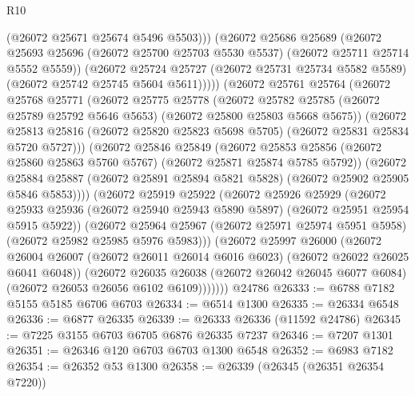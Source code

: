 \begin{lexlean}{R10}
\begin{coremodule}
                (@26072 @25671 @25674 @5496 @5503)))
            (@26072
              @25686
              @25689
              (@26072
                @25693
                @25696
                (@26072 @25700 @25703 @5530 @5537)
                (@26072 @25711 @25714 @5552 @5559))
              (@26072
                @25724
                @25727
                (@26072 @25731 @25734 @5582 @5589)
                (@26072 @25742 @25745 @5604 @5611)))))
        (@26072
          @25761
          @25764
          (@26072
            @25768
            @25771
            (@26072
              @25775
              @25778
              (@26072
                @25782
                @25785
                (@26072 @25789 @25792 @5646 @5653)
                (@26072 @25800 @25803 @5668 @5675))
              (@26072
                @25813
                @25816
                (@26072 @25820 @25823 @5698 @5705)
                (@26072 @25831 @25834 @5720 @5727)))
            (@26072
              @25846
              @25849
              (@26072
                @25853
                @25856
                (@26072 @25860 @25863 @5760 @5767)
                (@26072 @25871 @25874 @5785 @5792))
              (@26072
                @25884
                @25887
                (@26072 @25891 @25894 @5821 @5828)
                (@26072 @25902 @25905 @5846 @5853))))
          (@26072
            @25919
            @25922
            (@26072
              @25926
              @25929
              (@26072
                @25933
                @25936
                (@26072 @25940 @25943 @5890 @5897)
                (@26072 @25951 @25954 @5915 @5922))
              (@26072
                @25964
                @25967
                (@26072 @25971 @25974 @5951 @5958)
                (@26072 @25982 @25985 @5976 @5983)))
            (@26072
              @25997
              @26000
              (@26072
                @26004
                @26007
                (@26072 @26011 @26014 @6016 @6023)
                (@26072 @26022 @26025 @6041 @6048))
              (@26072
                @26035
                @26038
                (@26072 @26042 @26045 @6077 @6084)
                (@26072 @26053 @26056 @6102 @6109)))))))
    @24786
@26333 := @6788 @7182 @5155 @5185 @6706 @6703
@26334 := @6514 @1300
@26335 := @26334 @6548
@26336 := @6877 @26335
@26339 := @26333 @26336 (@11592 @24786)
@26345 := @7225 @3155 @6703 @6705 @6876 @26335 @7237
@26346 := @7207 @1301
@26351 := @26346 @120 @6703 @6703 @1300 @6548
@26352 := @6983 @7182
@26354 := @26352 @53 @1300
@26358 := @26339 (@26345 (@26351 @26354 @7220))

\end{coremodule}
\end{lexlean}
